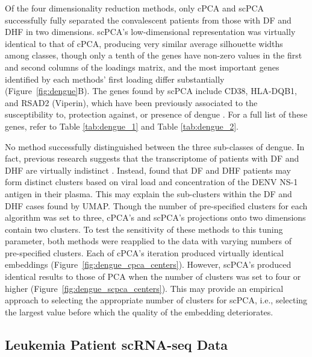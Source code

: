 Of the four dimensionality reduction methods, only cPCA and scPCA successfully fully separated the convalescent patients from those with DF and DHF in two dimensions. scPCA's low-dimensional representation was virtually identical to that of cPCA, producing very similar average silhouette widths among classes, though only a tenth of the genes have non-zero values in the first and second columns of the loadings matrix, and the most important genes identified by each methods' first loading differ substantially (Figure~\ref{fig:dengue}B). The genes found by scPCA include CD38, HLA-DQB1, and RSAD2 (Viperin), which have been previously associated to the susceptibility to, protection against, or presence of dengue \citep{Castaneda2016,Cardozo2014,Fitzgerald2011}. For a full list of these genes, refer to Table \ref{tab:dengue_1} and Table \ref{tab:dengue_2}. 

No method successfully distinguished between the three sub-classes of dengue. In fact, previous research suggests that the transcriptome of patients with DF and DHF are virtually indistinct \citep{Kwissa2014}. Instead, \citet{Kwissa2014} found that DF and DHF patients may form distinct clusters based on viral load and concentration of the DENV NS-1 antigen in their plasma. This may explain the sub-clusters within the DF and DHF cases found by UMAP. Though the number of pre-specified clusters for each algorithm was set to three, cPCA's and scPCA's projections onto two dimensions contain two clusters. To test the sensitivity of these methods to this tuning parameter, both methods were reapplied to the data with varying numbers of pre-specified clusters. Each of cPCA's iteration produced virtually identical embeddings (Figure~\ref{fig:dengue_cpca_centers}). However, scPCA's produced identical results to those of PCA when the number of clusters was set to four or higher (Figure~\ref{fig:dengue_scpca_centers}). This may provide an empirical approach to selecting the appropriate number of clusters for scPCA, i.e., selecting the largest value before which the quality of the embedding deteriorates.


\subsection{Leukemia Patient scRNA-seq Data}\label{leukemia_data}

